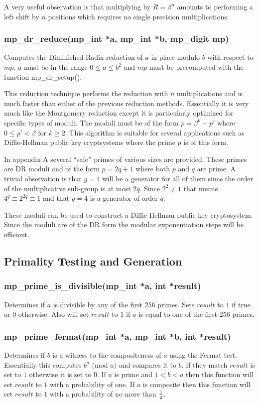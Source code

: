 \documentclass[]{article}
\begin{document}
A very useful observation is that multiplying by $R = \beta^n$ amounts to performing a left shift by $n$ positions which
requires no single precision multiplications.

\subsubsection{mp\_dr\_reduce(mp\_int *a, mp\_int *b, mp\_digit mp)}
Computes the Diminished-Radix reduction of $a$ in place modulo $b$ with respect to $mp$.  $a$ must be in the range 
$0 \le a \le b^2$ and $mp$ must be precomputed with the function mp\_dr\_setup().

This reduction technique performs the reduction with $n$ multiplications and is much faster than either of the previous
reduction methods.  Essentially it is very much like the Montgomery reduction except it is particularly optimized for
specific types of moduli.  The moduli must be of the form $p = \beta^k - p'$ where $0 \le p' < \beta$ for $k \ge 2$.  
This algorithm is suitable for several applications such as Diffie-Hellman public key cryptsystems where the prime $p$ is 
of this form.

In appendix A several ``safe'' primes of various sizes are provided.  These primes are DR moduli and of the form 
$p = 2q + 1$ where both $p$ and $q$ are prime.  A trivial observation is that $g = 4$ will be a generator for all of them
since the order of the multiplicative sub-group is at most $2q$.  Since $2^2 \ne 1$ that means $4^q \equiv 2^{2q} \equiv 1$ 
and that $g = 4$ is a generator of order $q$.

These moduli can be used to construct a Diffie-Hellman public key cryptosystem.  Since the moduli are of the
DR form the modular exponentiation steps will be efficient.

\subsection{Primality Testing and Generation}

\subsubsection{mp\_prime\_is\_divisible(mp\_int *a, int *result)}
Determines if $a$ is divisible by any of the first 256 primes.  Sets $result$ to $1$ if true or $0$ 
otherwise.  Also will set $result$ to $1$ if $a$ is equal to one of the first 256 primes.  

\subsubsection{mp\_prime\_fermat(mp\_int *a, mp\_int *b, int *result)}
Determines if $b$ is a witness to the compositeness of $a$ using the Fermat test.  Essentially this
computes $b^a \mbox{ (mod }a\mbox{)}$ and compares it to $b$.  If they match $result$ is set
to $1$ otherwise it is set to $0$.  If $a$ is prime and $1 < b < a$ then this function will set 
$result$ to $1$ with a probability of one.  If $a$ is composite then this function will set 
$result$ to $1$ with a probability of no more than $1 \over 2$.  
\end{document}
